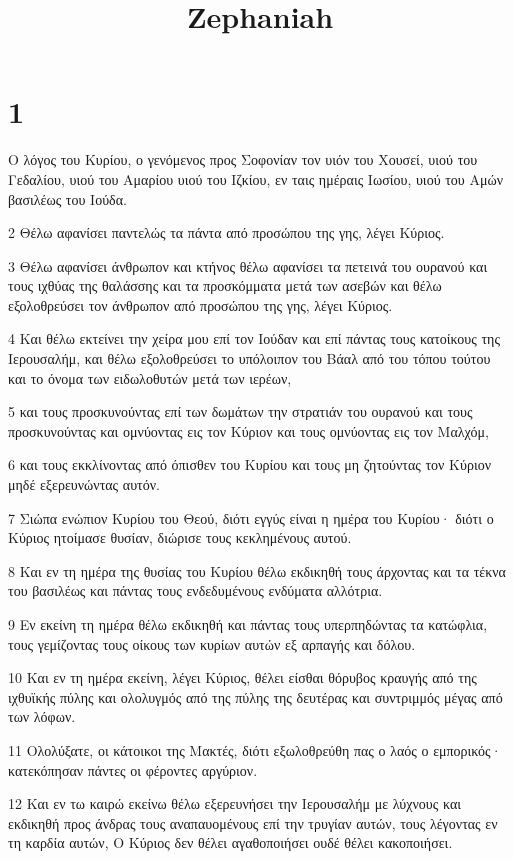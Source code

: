 

\title{Zephaniah}


\chapter{1}

\par Ο λόγος του Κυρίου, ο γενόμενος προς Σοφονίαν τον υιόν του Χουσεί, υιού του Γεδαλίου, υιού του Αμαρίου υιού του Ιζκίου, εν ταις ημέραις Ιωσίου, υιού του Αμών βασιλέως του Ιούδα.
\par 2 Θέλω αφανίσει παντελώς τα πάντα από προσώπου της γης, λέγει Κύριος.
\par 3 Θέλω αφανίσει άνθρωπον και κτήνος θέλω αφανίσει τα πετεινά του ουρανού και τους ιχθύας της θαλάσσης και τα προσκόμματα μετά των ασεβών και θέλω εξολοθρεύσει τον άνθρωπον από προσώπου της γης, λέγει Κύριος.
\par 4 Και θέλω εκτείνει την χείρα μου επί τον Ιούδαν και επί πάντας τους κατοίκους της Ιερουσαλήμ, και θέλω εξολοθρεύσει το υπόλοιπον του Βάαλ από του τόπου τούτου και το όνομα των ειδωλοθυτών μετά των ιερέων,
\par 5 και τους προσκυνούντας επί των δωμάτων την στρατιάν του ουρανού και τους προσκυνούντας και ομνύοντας εις τον Κύριον και τους ομνύοντας εις τον Μαλχόμ,
\par 6 και τους εκκλίνοντας από όπισθεν του Κυρίου και τους μη ζητούντας τον Κύριον μηδέ εξερευνώντας αυτόν.
\par 7 Σιώπα ενώπιον Κυρίου του Θεού, διότι εγγύς είναι η ημέρα του Κυρίου· διότι ο Κύριος ητοίμασε θυσίαν, διώρισε τους κεκλημένους αυτού.
\par 8 Και εν τη ημέρα της θυσίας του Κυρίου θέλω εκδικηθή τους άρχοντας και τα τέκνα του βασιλέως και πάντας τους ενδεδυμένους ενδύματα αλλότρια.
\par 9 Εν εκείνη τη ημέρα θέλω εκδικηθή και πάντας τους υπερπηδώντας τα κατώφλια, τους γεμίζοντας τους οίκους των κυρίων αυτών εξ αρπαγής και δόλου.
\par 10 Και εν τη ημέρα εκείνη, λέγει Κύριος, θέλει είσθαι θόρυβος κραυγής από της ιχθυϊκής πύλης και ολολυγμός από της πύλης της δευτέρας και συντριμμός μέγας από των λόφων.
\par 11 Ολολύξατε, οι κάτοικοι της Μακτές, διότι εξωλοθρεύθη πας ο λαός ο εμπορικός· κατεκόπησαν πάντες οι φέροντες αργύριον.
\par 12 Και εν τω καιρώ εκείνω θέλω εξερευνήσει την Ιερουσαλήμ με λύχνους και εκδικηθή προς άνδρας τους αναπαυομένους επί την τρυγίαν αυτών, τους λέγοντας εν τη καρδία αυτών, Ο Κύριος δεν θέλει αγαθοποιήσει ουδέ θέλει κακοποιήσει.
